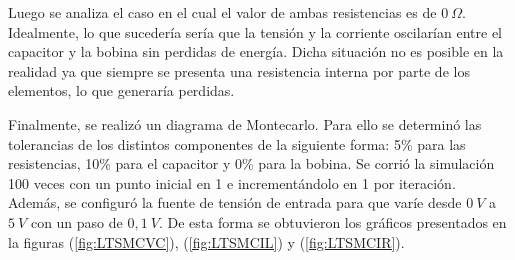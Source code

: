 \documentclass[a4paper]{article}
\begin{document}
%
%
%
%
%
%

Luego se analiza el caso en el cual el valor de ambas resistencias es de $0 \ \Omega$. Idealmente, lo que sucedería sería que la tensión y la corriente oscilarían entre el capacitor y la bobina sin perdidas de energía. Dicha situación no es posible en la realidad ya que siempre se presenta una resistencia interna por parte de los elementos, lo que generaría perdidas. 

Finalmente, se realizó un diagrama de Montecarlo. Para ello se determinó las tolerancias de los distintos componentes de la siguiente forma: 5\% para las resistencias, 10\% para el capacitor y 0\% para la bobina. Se corrió la simulación 100 veces con un punto inicial en 1 e incrementándolo en 1 por iteración. Además, se configuró la fuente de tensión de entrada para que varíe desde $0 \ V$ a $5 \ V$ con un paso de $0,1 \ V$. De esta forma se obtuvieron los gráficos presentados en la figuras (\ref{fig:LTSMCVC}), (\ref{fig:LTSMCIL}) y (\ref{fig:LTSMCIR}).
\end{document}
